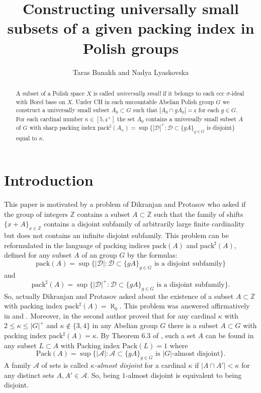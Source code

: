 \documentclass[11pt]{amsart}
\title[Packing index of universally small sets in Polish groups]{Constructing universally small subsets of a given packing index in Polish groups}
\author{Taras Banakh and Nadya Lyaskovska}
\begin{document}
\begin{abstract} A subset of a Polish space $X$ is called {\em universally small} if it belongs to each ccc $\sigma$-ideal with Borel base on $X$. Under CH in each uncountable Abelian Polish group $G$ we construct a universally small subset $A_0\subset G$ such that $|A_0\cap gA_0|=\mathfrak c$ for each $g\in G$. For each cardinal number $\kappa\in[5,\mathfrak c^+]$ the set $A_0$ contains a universally small subset $A$ of $G$ with sharp packing index ${\mathrm{pack}}^\sharp(A_\kappa)=\sup\{|\mathcal D|^+:\mathcal D\subset \{gA\}_{g\in G}$ is disjoint$\}$ equal to $\kappa$.
\end{abstract}
\maketitle
\baselineskip14pt

\section{Introduction}
This paper is motivated by a problem of Dikranjan and Protasov \cite{DP} who asked if the group of integers ${\mathbb Z}$ contains a subset $A\subset {\mathbb Z}$ such that the family of shifts $\{x+A\}_{x\in{\mathbb Z}}$ contains a disjoint subfamily of arbitrarily large finite cardinality but does not contains an infinite disjoint subfamily. This problem can be reformulated in the language of packing indices ${\mathrm{pack}}(A)$ and ${\mathrm{pack}}^\sharp(A)$, defined for any subset $A$ of an group $G$ by the formulas:
$${\mathrm{pack}}(A)=\sup\{|\mathcal D|:\mbox{$\mathcal D\subset\{gA\}_{g\in G}$ is a disjoint subfamily}\}$$
and
$${\mathrm{pack}}^\sharp(A)=\sup\{|\mathcal D|^+:\mbox{$\mathcal D\subset\{gA\}_{g\in G}$ is a disjoint subfamily}\}.$$
So, actually Dikranjan and Protasov asked about the existence of a subset $A\subset {\mathbb Z}$ with packing
index ${\mathrm{pack}}^\sharp(A)=\aleph_0$. This problem was answered affirmatively in \cite{BL1} and \cite{BL2}. Moreover, in  \cite{La} the second author proved that for any cardinal $\kappa$ with $2\le\kappa\le|G|^+$ and $\kappa\notin\{3,4\}$ in any Abelian group $G$ there is a subset $A\subset G$ with packing index ${\mathrm{pack}}^\sharp(A)=\kappa$. By Theorem 6.3 of \cite{BLR}, such a set $A$ can be found in any subset  $L\subset A$ with Packing index  ${\mathrm{Pack}}(L)=1$ where
$${\mathrm{Pack}}(A)=\sup\{|\mathcal A|:\mathcal A\subset\{gA\}_{g\in G}\mbox{ \ is $|G|$-almost disjoint}\}.$$
A family ${\mathcal A}$ of sets is called {\em $\kappa$-almost disjoint} for a cardinal $\kappa$ if $|A\cap A'|<\kappa$ for any distinct sets $A,A'\in{\mathcal A}$. So, being $1$-almost disjoint is equivalent to being disjoint.
\end{document}
